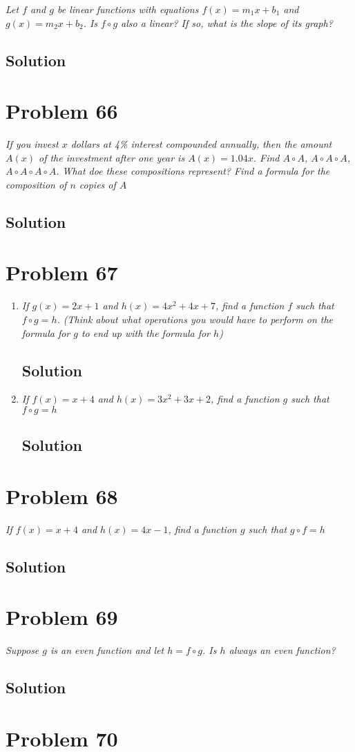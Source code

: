 \documentclass[11pt]{article}
\newcommand{\soln}{\subsection*}
\newcommand{\qn}{\textit}
\begin{document}
\qn{Let $f$ and $g$ be linear functions with equations $f(x)=m_1x+b_1$ and $g(x)=m_2x+b_2$. Is $f \circ g$ also a linear? If so, what is the slope of its graph?}

\soln{Solution}

\section*{Problem 66}

\qn{If you invest $x$ dollars at 4\% interest compounded annually, then the amount $A(x)$ of the investment after one year is $A(x)=1.04x$. Find $A \circ A$, $A \circ A \circ A$, $A \circ A \circ A \circ A$. What doe these compositions represent? Find a formula for the composition of $n$ copies of $A$}

\soln{Solution}

\section*{Problem 67}

\begin{enumerate}
	\item \qn{If $g(x)=2x+1$ and $h(x)=4x^2+4x+7$, find a function $f$ such that $f \circ g=h$. (Think about what operations you would have to perform on the formula for $g$ to end up with the formula for $h$)}
	\soln{Solution}
	
	\item \qn{If $f(x)=x+4$ and $h(x)=3x^2+3x+2$, find a function $g$ such that $f \circ g=h$}
	\soln{Solution}
\end{enumerate}

\section*{Problem 68}

\qn{If $f(x)=x+4$ and $h(x)=4x-1$, find a function $g$ such that $g \circ f=h$}

\soln{Solution}

\section*{Problem 69}

\qn{Suppose $g$ is an even function and let $h=f \circ g$. Is $h$ always an even function?}

\soln{Solution}

\section*{Problem 70}
\end{document}
